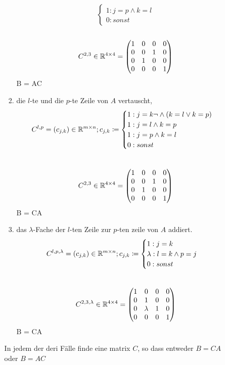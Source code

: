 \documentclass{HM}
\begin{document}
\begin{enumerate}
\begin{enumerate}
\begin{enumerate}
$$\begin{cases}
	1: j=p \land k=l\\
	0: sonst
\end{cases}$$\\
$$C^{2,3} \in\mathbb{R}^{4\times 4} = \begin{pmatrix}
		1&0&0&0\\
		0&0&1&0\\
		0&1&0&0\\
		0&0&0&1\\
	\end{pmatrix}$$
B = AC
\\
\item die $l$-te und die $p$-te Zeile von $A$ vertauscht,
$$C^{l,p} = (c_{j,k}) \in \mathbb{R}^{m\times n}; c_{j,k} \coloneqq \begin{cases}
	1: j=k \lnot\land (k=l \lor k=p)\\
	1: j=l \land k=p\\
	1: j=p \land k=l\\
	0: sonst
\end{cases}$$\\
$$C^{2,3} \in\mathbb{R}^{4\times 4} = \begin{pmatrix}
	1&0&0&0\\
	0&0&1&0\\
	0&1&0&0\\
	0&0&0&1\\
\end{pmatrix}$$
B = CA
\\
\item das $\lambda$-Fache der $l$-ten Zeile zur $p$-ten zeile von $A$ addiert.\\
$$C^{l,p,\lambda} = (c_{j,k}) \in \mathbb{R}^{m\times n}; c_{j,k} \coloneqq \begin{cases}
	1: j=k\\
	\lambda: l=k \land p=j\\
	0: sonst
\end{cases}$$\\
$$C^{2,3,\lambda} \in\mathbb{R}^{4\times 4} = \begin{pmatrix}
	1&0&0&0\\
	0&1&0&0\\
	0&\lambda&1&0\\
	0&0&0&1\\
\end{pmatrix}$$
B = CA
\\
\end{enumerate}
In jedem der deri Fälle finde eine matrix $C$, so dass entweder $B=CA$ oder $B=AC$
\end{enumerate}
\end{enumerate}
\end{document}
